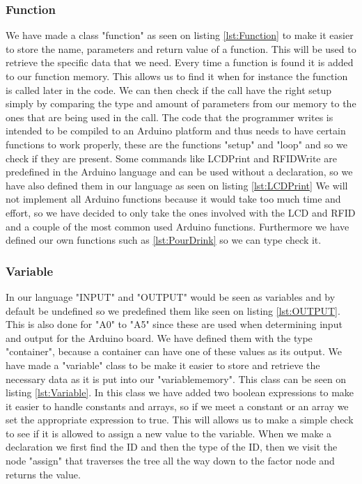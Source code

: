 \subsubsection{Function}
\label{sec:Function}
We have made a class "function" as seen on listing \ref{lst:Function} to make it easier to store the name, parameters and return value of a function. This will be used to retrieve the specific data that we need. Every time a function is found it is added to our function memory. This allows us to find it when for instance the function is called later in the code. We can then check if the call have the right setup simply by comparing the type and amount of parameters from our memory to the ones that are being used in the call.
The code that the programmer writes is intended to be compiled to an Arduino platform and thus needs to have certain functions to work properly, these are the functions "setup" and "loop" and so we check if they are present. Some commands like LCDPrint and RFIDWrite are predefined in the Arduino language and can be used without a declaration, so we have also defined them in our language as seen on listing \ref{lst:LCDPrint}
We will not implement all Arduino functions because it would take too much time and effort, so we have decided to only take the ones involved with the LCD and RFID and a couple of the most common used Arduino functions. Furthermore we have defined our own functions such as \ref{lst:PourDrink} so we can type check it.

\subsubsection{Variable}
\label{sec:Variable}
In our language "INPUT" and "OUTPUT" would be seen as variables and by default be undefined so we predefined them like seen on listing \ref{lst:OUTPUT}. This is also done for "A0" to "A5" since these are used when determining input and output for the Arduino board. We have defined them with the type "container", because a container can have one of these values as its output.
We have made a "variable" class to be make it easier to store and retrieve the necessary data as it is put into our "variablememory". This class can be seen on listing \ref{lst:Variable}. In this class we have added two boolean expressions to make it easier to handle constants and arrays, so if we meet a constant or an array we set the appropriate expression to true. This will allows us to make a simple check to see if it is allowed to assign a new value to the variable.
When we make a declaration we first find the ID and then the type of the ID, then we visit the node "assign" that traverses the tree all the way down to the factor node and returns the value.

